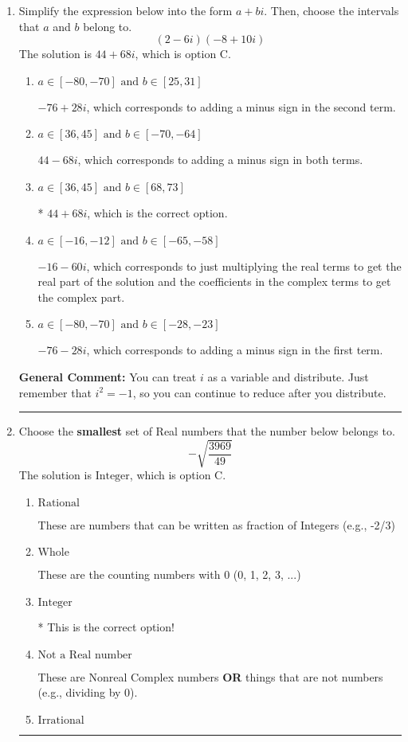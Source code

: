 \documentclass{extbook}[14pt]
\newcommand{\litem}[1]{\item #1

\rule{\textwidth}{0.4pt}}
\begin{document}
\begin{enumerate}\litem{
Simplify the expression below into the form $a+bi$. Then, choose the intervals that $a$ and $b$ belong to.
\[ (2 - 6 i)(-8 + 10 i) \]The solution is \( 44 + 68 i \), which is option C.\begin{enumerate}[label=\Alph*.]
\item \( a \in [-80, -70] \text{ and } b \in [25, 31] \)

 $-76 + 28 i$, which corresponds to adding a minus sign in the second term.
\item \( a \in [36, 45] \text{ and } b \in [-70, -64] \)

 $44 - 68 i$, which corresponds to adding a minus sign in both terms.
\item \( a \in [36, 45] \text{ and } b \in [68, 73] \)

* $44 + 68 i$, which is the correct option.
\item \( a \in [-16, -12] \text{ and } b \in [-65, -58] \)

 $-16 - 60 i$, which corresponds to just multiplying the real terms to get the real part of the solution and the coefficients in the complex terms to get the complex part.
\item \( a \in [-80, -70] \text{ and } b \in [-28, -23] \)

 $-76 - 28 i$, which corresponds to adding a minus sign in the first term.
\end{enumerate}

\textbf{General Comment:} You can treat $i$ as a variable and distribute. Just remember that $i^2=-1$, so you can continue to reduce after you distribute.
}
\litem{
Choose the \textbf{smallest} set of Real numbers that the number below belongs to.
\[ -\sqrt{\frac{3969}{49}} \]The solution is \( \text{Integer} \), which is option C.\begin{enumerate}[label=\Alph*.]
\item \( \text{Rational} \)

These are numbers that can be written as fraction of Integers (e.g., -2/3)
\item \( \text{Whole} \)

These are the counting numbers with 0 (0, 1, 2, 3, ...)
\item \( \text{Integer} \)

* This is the correct option!
\item \( \text{Not a Real number} \)

These are Nonreal Complex numbers \textbf{OR} things that are not numbers (e.g., dividing by 0).
\item \( \text{Irrational} \)


\end{enumerate}}
\end{enumerate}
\end{document}
